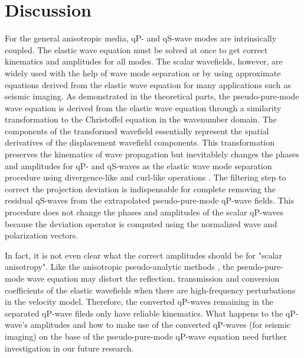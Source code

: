 \section{Discussion}

For the general anisotropic media, qP- and qS-wave modes are intrinsically coupled.
The elastic wave equation must be solved at once to get correct kinematics and amplitudes
for all modes. The scalar wavefields, however, are widely used with the help of
wave mode separation or by using approximate equations derived from the elastic wave equation 
for many applications such as seismic imaging.
As demonstrated in the theoretical parts, the pseudo-pure-mode wave equation is derived
from the elastic wave equation through a similarity transformation to the Christoffel
equation in the wavenumber domain. The components of the transformed wavefield essentially
represent the spatial derivatives of the displacement wavefield components.
This transformation preserves the kinematics of wave propagation but inevitablely
changes the phases and amplitudes for qP- and qS-waves as the 
elastic wave mode separation procedure using divergence-like and curl-like operations
\cite[]{dellinger.etgen:1990,yan.sava:2009,zhang.mcmechan:2010}.
The filtering step to correct the projection deviation is indispensable for complete
removing the residual qS-waves from the extrapolated pseudo-pure-mode qP-wave fields.
This procedure does not change the phases and amplitudes of the scalar qP-waves because
the deviation operator is computed using the normalized wave and polarization vectors.

In fact, it is not even clear what the correct amplitudes should be for "scalar anisotropy".
Like the anisotropic pseudo-analytic methods \cite[]{etgen:2009,fomel:2013,zhan:2012,song:2013},
the pseudo-pure-mode wave equation may distort the reflection, transmission and conversion
coefficients of the elastic wavefields when there are high-frequency perturbations in the velocity model.
Therefore, the converted qP-waves remaining in the separated qP-wave fileds only have reliable kinematics. 
What happens to the qP-wave's amplitudes and how to
make use of the converted qP-waves (for seismic imaging) 
on the base of the pseudo-pure-mode qP-wave equation need further investigation in our future research.
